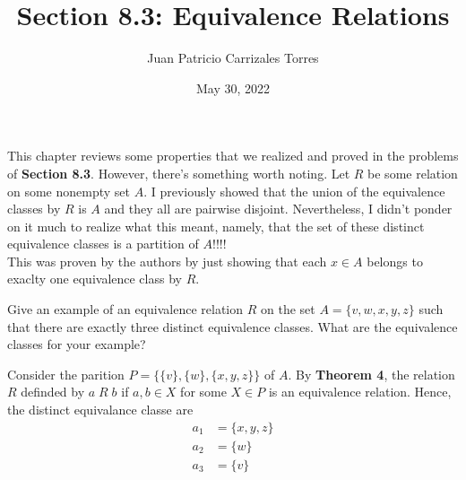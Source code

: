 \documentclass[12pt]{article}
\newenvironment{problem}[2][Problem]{\begin{trivlist}
		\item[\hskip \labelsep {\bfseries #1}\hskip \labelsep {\bfseries #2.}]}{\end{trivlist}}
\newenvironment{solution}[2][Solution]{\begin{trivlist}
		\item[\hskip \labelsep {\bfseries #1}\hskip \labelsep {\bfseries #2.}]}{\end{trivlist}}
\begin{document}
 
	
	\title{Section 8.3: Equivalence Relations}
	\author{Juan Patricio Carrizales Torres}
	\date{May 30, 2022}
	\maketitle
	
	This chapter reviews some properties that we realized and proved in the problems of \textbf{Section 8.3}. However, there's something worth noting. Let $R$ be some relation on some nonempty set $A$. I previously showed that the union of the equivalence classes by $R$ is $A$ and they all are pairwise disjoint. Nevertheless, I didn't ponder on it much to realize what this meant, namely, that the set of these distinct equivalence classes is a partition of $A$!!!!\\
	 This was proven by the authors by just showing that each $x\in A$ belongs to exaclty one equivalence class by $R$. 
	 
	 \begin{problem}{36}
	 	Give an example of an equivalence relation $R$ on the set $A=\{v,w,x,y,z\}$ such that there are exactly three distinct equivalence classes. What are the equivalence classes for your example?
	 	\begin{solution}{36}
	 		Consider the parition $P = \{\{v\},\{w\},\{x,y,z\}\}$ of $A$. By \textbf{Theorem 4}, the relation $R$ definded by $a\; R \; b$ if $a,b\in  X$ for some $X\in P$ is an equivalence relation. Hence, the distinct equivalance classe are
	 		\begin{align*}
	 			a_{1} &= \{x,y,z\}\\
	 			a_{2} &= \{w\}\\
	 			a_{3} &= \{v\}
	 		\end{align*}
	 	\end{solution}
	 \end{problem} 
 
\end{document}
